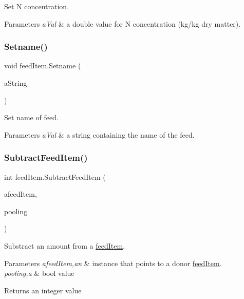 Set N concentration. 


\begin{DoxyParams}{Parameters}
{\em a\+Val} & a double value for N concentration (kg/kg dry matter). \\
\hline
\end{DoxyParams}
\mbox{\label{classfeed_item_adb5ed4f3fb13af47befd3c63d5005405}} 
\subsubsection{\texorpdfstring{Setname()}{Setname()}}
{\footnotesize\ttfamily void feed\+Item.\+Setname (\begin{DoxyParamCaption}\item[{string}]{a\+String }\end{DoxyParamCaption})\hspace{0.3cm}{\ttfamily [inline]}}



Set name of feed. 


\begin{DoxyParams}{Parameters}
{\em a\+Val} & a string containing the name of the feed. \\
\hline
\end{DoxyParams}
\mbox{\label{classfeed_item_a25b913edb05531ddef50ca8aa05e960d}} 
\subsubsection{\texorpdfstring{SubtractFeedItem()}{SubtractFeedItem()}}
{\footnotesize\ttfamily int feed\+Item.\+Subtract\+Feed\+Item (\begin{DoxyParamCaption}\item[{\mbox{\hyperlink{classfeed_item}{feed\+Item}}}]{afeed\+Item,  }\item[{bool}]{pooling }\end{DoxyParamCaption})\hspace{0.3cm}{\ttfamily [inline]}}



Substract an amount from a \mbox{\hyperlink{classfeed_item}{feed\+Item}}. 


\begin{DoxyParams}{Parameters}
{\em afeed\+Item,an} & instance that points to a donor \mbox{\hyperlink{classfeed_item}{feed\+Item}}. \\
\hline
{\em pooling,a} & bool value \\
\hline
\end{DoxyParams}
\begin{DoxyReturn}{Returns}
an integer value 
\end{DoxyReturn}
\mbox{\label{classfeed_item_a54c2b2dcc473131ba9ef87e66e716eac}} 
